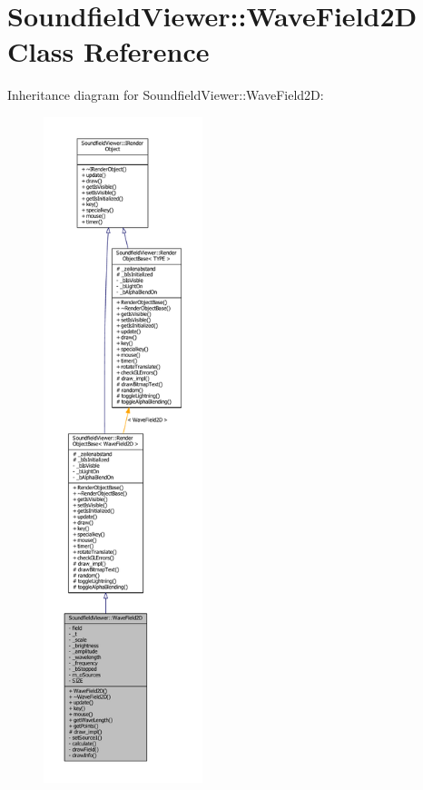 \section{Soundfield\-Viewer\-:\-:Wave\-Field2\-D Class Reference}
\label{classSoundfieldViewer_1_1WaveField2D}


Inheritance diagram for Soundfield\-Viewer\-:\-:Wave\-Field2\-D\-:
\nopagebreak
\begin{figure}[H]
\begin{center}
\leavevmode
\includegraphics[height=550pt]{d1/dcc/classSoundfieldViewer_1_1WaveField2D__inherit__graph}
\end{center}
\end{figure}


